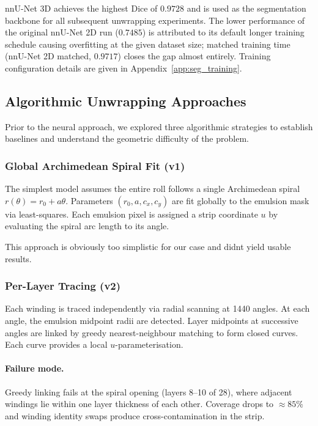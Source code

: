 \documentclass[11pt,a4paper]{article}
\begin{document}
nnU-Net 3D achieves the highest Dice of $0.9728$ and is used as the segmentation backbone for all subsequent unwrapping experiments. The lower performance of the original nnU-Net 2D run ($0.7485$) is attributed to its default longer training schedule causing overfitting at the given dataset size; matched training time (nnU-Net 2D matched, $0.9717$) closes the gap almost entirely. Training configuration details are given in Appendix~\ref{app:seg_training}.

\subsection{Algorithmic Unwrapping Approaches}
\label{sec:algorithmic}

Prior to the neural approach, we explored three algorithmic strategies to establish baselines and understand the geometric difficulty of the problem.

\subsubsection{Global Archimedean Spiral Fit (v1)}

The simplest model assumes the entire roll follows a single Archimedean spiral $r(\theta) = r_0 + a\theta$. Parameters $(r_0, a, c_x, c_y)$ are fit globally to the emulsion mask via least-squares. Each emulsion pixel is assigned a strip coordinate $u$ by evaluating the spiral arc length to its angle.

This approach is obviously too simplistic for our case and didnt yield usable results.

\subsubsection{Per-Layer Tracing (v2)}

Each winding is traced independently via radial scanning at 1440 angles. At each angle, the emulsion midpoint radii are detected. Layer midpoints at successive angles are linked by greedy nearest-neighbour matching to form closed curves. Each curve provides a local $u$-parameterisation.

\paragraph{Failure mode.} Greedy linking fails at the spiral opening (layers 8--10 of 28), where adjacent windings lie within one layer thickness of each other. Coverage drops to $\approx 85\%$ and winding identity swaps produce cross-contamination in the strip.
\end{document}
